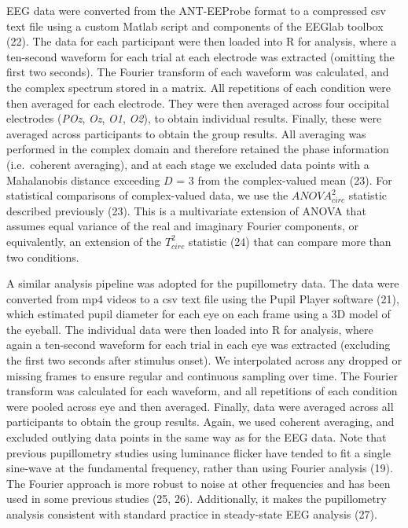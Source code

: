 \documentclass[
]{article}
\begin{document}
EEG data were converted from the ANT-EEProbe format to a compressed csv text file using a custom Matlab script and components of the EEGlab toolbox (22). The data for each participant were then loaded into R for analysis, where a ten-second waveform for each trial at each electrode was extracted (omitting the first two seconds). The Fourier transform of each waveform was calculated, and the complex spectrum stored in a matrix. All repetitions of each condition were then averaged for each electrode. They were then averaged across four occipital electrodes (\emph{POz}, \emph{Oz}, \emph{O1}, \emph{O2}), to obtain individual results. Finally, these were averaged across participants to obtain the group results. All averaging was performed in the complex domain and therefore retained the phase information (i.e.~coherent averaging), and at each stage we excluded data points with a Mahalanobis distance exceeding \(D\) = 3 from the complex-valued mean (23). For statistical comparisons of complex-valued data, we use the \(ANOVA^2_{circ}\) statistic described previously (23). This is a multivariate extension of ANOVA that assumes equal variance of the real and imaginary Fourier components, or equivalently, an extension of the \(T^2_{circ}\) statistic (24) that can compare more than two conditions.

A similar analysis pipeline was adopted for the pupillometry data. The data were converted from mp4 videos to a csv text file using the Pupil Player software (21), which estimated pupil diameter for each eye on each frame using a 3D model of the eyeball. The individual data were then loaded into R for analysis, where again a ten-second waveform for each trial in each eye was extracted (excluding the first two seconds after stimulus onset). We interpolated across any dropped or missing frames to ensure regular and continuous sampling over time. The Fourier transform was calculated for each waveform, and all repetitions of each condition were pooled across eye and then averaged. Finally, data were averaged across all participants to obtain the group results. Again, we used coherent averaging, and excluded outlying data points in the same way as for the EEG data. Note that previous pupillometry studies using luminance flicker have tended to fit a single sine-wave at the fundamental frequency, rather than using Fourier analysis (19). The Fourier approach is more robust to noise at other frequencies and has been used in some previous studies (25, 26). Additionally, it makes the pupillometry analysis consistent with standard practice in steady-state EEG analysis (27).
\end{document}
